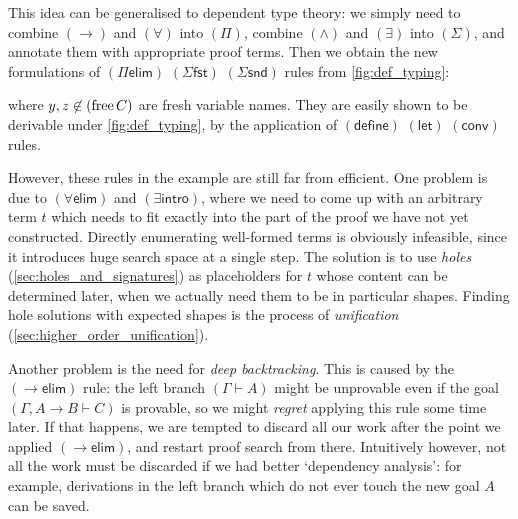 \documentclass[twoside]{report}
\begin{document}
This idea can be generalised to dependent type theory: we simply need to combine $(\to)$ and $(\forall)$ into $(\Pi)$, combine $(\land)$ and $(\exists)$ into $(\Sigma)$, and annotate them with appropriate proof terms. Then we obtain the new formulations of $(\Pi\mathsf{elim})$ $(\Sigma\mathsf{fst})$ $(\Sigma\mathsf{snd})$ rules from \cref{fig:def_typing}:
\begin{prooftree}
\end{prooftree}
\begin{prooftree}
\end{prooftree}
where $y, z \not\in (\free C)$ are fresh variable names. They are easily shown to be derivable under \cref{fig:def_typing}, by the application of $(\mathsf{define})$ $(\mathsf{let})$ $(\mathsf{conv})$ rules.

However, these rules in the example are still far from efficient. One problem is due to $({\forall}\mathsf{elim})$ and $({\exists}\mathsf{intro})$, where we need to come up with an arbitrary term $t$ which needs to fit exactly into the part of the proof we have not yet constructed. Directly enumerating well-formed terms is obviously infeasible, since it introduces huge search space at a single step. The solution is to use \emph{holes} (\cref{sec:holes_and_signatures}) as placeholders for $t$ whose content can be determined later, when we actually need them to be in particular shapes. Finding hole solutions with expected shapes is the process of \emph{unification} (\cref{sec:higher_order_unification}).

Another problem is the need for \emph{deep backtracking}. This is caused by the $({\to}\mathsf{elim})$ rule: the left branch $(\Gamma \vdash A)$ might be unprovable even if the goal $(\Gamma, A\to B \vdash C)$ is provable, so we might \emph{regret} applying this rule some time later. If that happens, we are tempted to discard all our work after the point we applied $({\to}\mathsf{elim})$, and restart proof search from there. Intuitively however, not all the work must be discarded if we had better `dependency analysis': for example, derivations in the left branch which do not ever touch the new goal $A$ can be saved.
\end{document}
